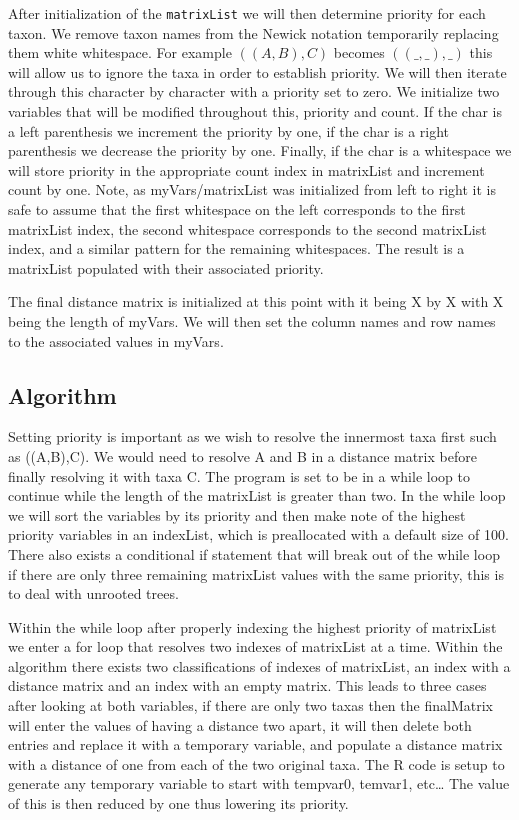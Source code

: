 \documentclass{article}
\begin{document}
After initialization of the {\tt matrixList} we will then determine priority for each taxon. We remove taxon names from the Newick notation temporarily replacing them white whitespace. For example $((A,B),C)$ becomes $((\_,\_),\_)$ this will allow us to ignore the taxa in order to establish priority. We will then iterate through this character by character with a priority set to zero. We initialize two variables that will be modified throughout this, priority and count. If the char is a left parenthesis we increment the priority by one, if the char is a right parenthesis we decrease the priority by one. Finally, if the char is a whitespace we will store priority in the appropriate count index in matrixList and increment count by one. Note, as myVars/matrixList was initialized from left to right it is safe to assume that the first whitespace on the left corresponds to the first matrixList index, the second whitespace corresponds to the second matrixList index, and a similar pattern for the remaining whitespaces. The result is a matrixList populated with their associated priority. 

The final distance matrix is initialized at this point with it being X by X with X being the length of myVars. We will then set the column names and row names to the associated values in myVars. 


\subsection{Algorithm}

Setting priority is important as we wish to resolve the innermost taxa first such as ((A,B),C). We would need to resolve A and B in a distance matrix before finally resolving it with taxa C.  The program is set to be in a while loop to continue while the length of the matrixList is greater than two. In the while loop we will sort the variables by its priority and then make note of the highest priority variables in an indexList, which is preallocated with a default size of 100. There also exists a conditional if statement that will break out of the while loop if there are only three remaining matrixList values with the same priority, this is to deal with unrooted trees.

Within the while loop after properly indexing the highest priority of matrixList we enter a for loop that resolves two indexes of matrixList at a time. Within the algorithm there exists two classifications of indexes of matrixList, an index with a distance matrix and an index with an empty matrix. This leads to three cases after looking at both variables, if there are only two taxas then the finalMatrix will enter the values of having a distance two apart, it will then delete both entries and replace it with a temporary variable, and populate a distance matrix with a distance of one from each of the two original taxa. The R code is setup to generate any temporary variable to start with tempvar0, temvar1, etc… The value of this is then reduced by one thus lowering its priority. 
\end{document}
